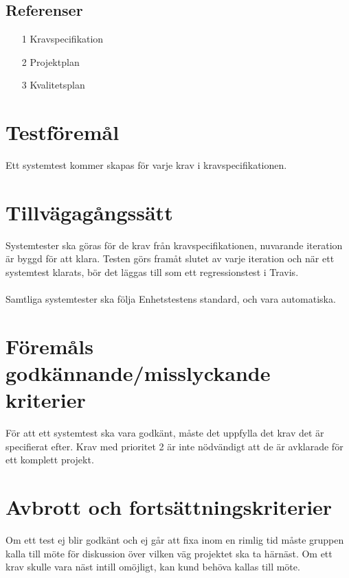 \documentclass[10pt]{article}
\begin{document}
	\subsection{Referenser}
		\begin{itemize}
		\item [1] Kravspecifikation
		\item [2] Projektplan
		\item [3] Kvalitetsplan
		\end{itemize}

	
\section{Testföremål}
	Ett systemtest kommer skapas för varje krav i kravspecifikationen.

	
	
	


\section{Tillvägagångssätt}
	Systemtester ska göras för de krav från kravspecifikationen, nuvarande iteration är byggd för att klara. Testen görs framåt slutet av varje iteration och när ett systemtest klarats, bör det läggas till som ett regressionstest i Travis.\\
	\\
	Samtliga systemtester ska följa Enhetstestens standard, och vara automatiska. 		
	
	
	

\section{Föremåls godkännande/misslyckande kriterier}
	För att ett systemtest ska vara godkänt, måste det uppfylla det krav det är specifierat efter. Krav med prioritet 2 är inte nödvändigt att de är avklarade för ett komplett projekt.\\


\section{Avbrott och fortsättningskriterier}
	Om ett test ej blir godkänt och ej går att fixa inom en rimlig tid måste gruppen kalla till möte för diskussion över vilken väg projektet ska ta härnäst. Om ett krav skulle vara näst intill omöjligt, kan kund behöva kallas till möte.
	
\end{document}

